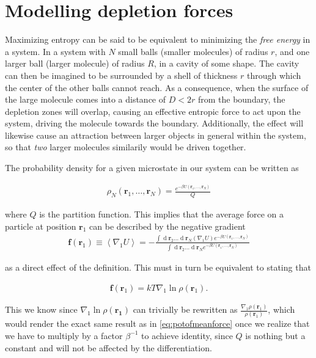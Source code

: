 \documentclass[a4paper,12pt]{article}
\renewcommand{\d}[1]{\ensuremath{\operatorname{d}\!{#1}}} %
\theoremstyle{plain}
\theoremstyle{definition}
\begin{document}
\section{Modelling depletion forces}
   Maximizing entropy can be said to be equivalent to minimizing the
   \textit{free energy} in a system. In a system with $N$ small balls (smaller
   molecules) of radius $r$, and one larger ball (larger molecule) of radius
   $R$, in a cavity of some shape. The cavity can then be
   imagined to be surrounded by a shell of thickness $r$ through which the
   center of the other balls cannot reach. As a consequence, when the surface of the
   large molecule comes into a distance of $D<2r$ from the boundary, the
   depletion zones will overlap, causing an effective entropic force to act upon
   the system, driving the molecule towards the boundary. Additionally, the
   effect will likewise cause an attraction between larger objects in general
   within the system, so that \emph{two} larger molecules similarily would be
   driven together. 
   
   The probability density for a given microstate in our system can be written
   as 

   \begin{align}
      \rho_N(\mathbf r_1, \ldots, \mathbf r_N) = \frac{e^{-\beta U(\mathbf r_1,
      \ldots, \mathbf r_N)}}{Q}
   \end{align}

   where $Q$ is the partition function. This implies that the average force on a
   particle at position $\mathbf r_1$ can be described by the negative gradient
   \begin{align}
      \mathbf{f} (\mathbf{r}_1) \equiv \left\langle \nabla_1 U \right\rangle = -
      \frac{\int \d{ \mathbf{r}_2} \ldots \d{ \mathbf{r}_N} 
      \left( \nabla_1 U \right) 
      e^{ -\beta U( \mathbf{r}_1, \ldots, \mathbf{r}_N)}}
      {\int \d{ \mathbf{r}_2} \ldots \d{ \mathbf{r}_N} e^{-\beta U( \mathbf{r}_1,
      \ldots, \mathbf{r}_N)}}
      \label{eq:potofmeanforce}
   \end{align}

   as a direct effect of the definition. This must in turn be equivalent to
   stating that

   \begin{align}
      \mathbf f(\mathbf r_1) = kT\nabla_1 \ln \rho(\mathbf r_1).
      \label{eq:exercise_1}
   \end{align}
   
   This we know since $\nabla_1 \ln\rho(\mathbf{r_1})$ can trivially be rewritten
   as $\frac{\nabla_1\rho(\mathbf r_1)}{\rho(\mathbf r_1)}$, which would
   render the exact same result as in \cref{eq:potofmeanforce} once we realize that we have
   to multiply by a factor $\beta^{-1}$ to achieve identity, since $Q$ is nothing
   but a constant and will not be affected by the differentiation. 
  
\end{document}
